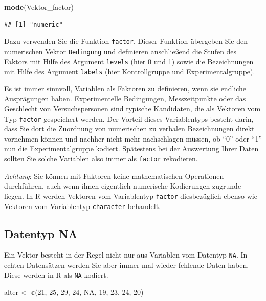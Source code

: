 \documentclass[
  ngerman,
]{book}
\newenvironment{Shaded}{\begin{snugshade}}{\end{snugshade}}
\newcommand{\ConstantTok}[1]{\textcolor[rgb]{0.56,0.35,0.01}{#1}}
\newcommand{\DecValTok}[1]{\textcolor[rgb]{0.00,0.00,0.81}{#1}}
\newcommand{\FunctionTok}[1]{\textcolor[rgb]{0.13,0.29,0.53}{\textbf{#1}}}
\newcommand{\NormalTok}[1]{#1}
\newcommand{\OtherTok}[1]{\textcolor[rgb]{0.56,0.35,0.01}{#1}}
\begin{document}
\begin{Shaded}
\begin{Highlighting}[]
\FunctionTok{mode}\NormalTok{(Vektor\_factor)}
\end{Highlighting}
\end{Shaded}

\begin{verbatim}
## [1] "numeric"
\end{verbatim}

Dazu verwenden Sie die Funktion \texttt{factor}. Dieser Funktion übergeben Sie den numerischen Vektor \texttt{Bedingung} und definieren anschließend die Stufen des Faktors mit Hilfe des Argument \texttt{levels} (hier 0 und 1) sowie die Bezeichnungen mit Hilfe des Argument \texttt{labels} (hier Kontrollgruppe und Experimentalgruppe).

Es ist immer sinnvoll, Variablen als Faktoren zu definieren, wenn sie endliche Ausprägungen haben. Experimentelle Bedingungen, Messzeitpunkte oder das Geschlecht von Versuchspersonen sind typische Kandidaten, die als Vektoren vom Typ \texttt{factor} gespeichert werden. Der Vorteil dieses Variablentyps besteht darin, dass Sie dort die Zuordnung von numerischen zu verbalen Bezeichnungen direkt vornehmen können und nachher nicht mehr nachschlagen müssen, ob ``0'' oder ``1'' nun die Experimentalgruppe kodiert. Spätestens bei der Auswertung Ihrer Daten sollten Sie solche Variablen also immer als \texttt{factor} rekodieren.

\emph{Achtung}: Sie können mit Faktoren keine mathematischen Operationen durchführen, auch wenn ihnen eigentlich numerische Kodierungen zugrunde liegen. In R werden Vektoren vom Variablentyp \texttt{factor} diesbezüglich ebenso wie Vektoren vom Variablentyp \texttt{character} behandelt.

\subsection{Datentyp NA}\label{datentyp-na}

Ein Vektor besteht in der Regel nicht nur aus Variablen vom Datentyp \texttt{NA}. In echten Datensätzen werden Sie aber immer mal wieder fehlende Daten haben. Diese werden in R als \texttt{NA} kodiert.

\begin{Shaded}
\begin{Highlighting}[]
\NormalTok{alter }\OtherTok{\textless{}{-}} \FunctionTok{c}\NormalTok{(}\DecValTok{21}\NormalTok{, }\DecValTok{25}\NormalTok{, }\DecValTok{29}\NormalTok{, }\DecValTok{24}\NormalTok{, }\ConstantTok{NA}\NormalTok{, }\DecValTok{19}\NormalTok{, }\DecValTok{23}\NormalTok{, }\DecValTok{24}\NormalTok{, }\DecValTok{20}\NormalTok{)}
\end{Highlighting}
\end{Shaded}
\end{document}
